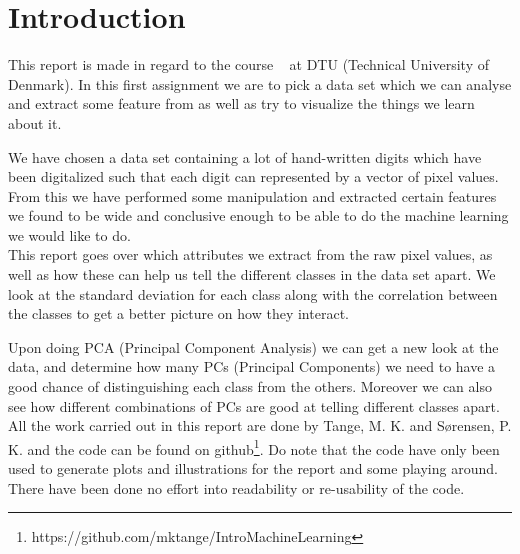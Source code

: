 \chapter{Introduction}
This report is made in regard to the course \textsf{\courseno\ \coursename} at DTU (Technical University of Denmark). In this first assignment we are to pick a data set which we can analyse and extract some feature from as well as try to visualize the things we learn about it.

We have chosen a data set containing a lot of hand-written digits which have been digitalized such that each digit can represented by a vector of pixel values. From this we have performed some manipulation and extracted certain features we found to be wide and conclusive enough to be able to do the machine learning we would like to do. \\

This report goes over which attributes we extract from the raw pixel values, as well as how these can help us tell the different classes in the data set apart. We look at the standard deviation for each class along with the correlation between the classes to get a better picture on how they interact.

Upon doing PCA (Principal Component Analysis) we can get a new look at the data, and determine how many PCs (Principal Components) we need to have a good chance of distinguishing each class from the others. Moreover we can also see how different combinations of PCs are good at telling different classes apart.\\

All the work carried out in this report are done by Tange, M. K. and Sørensen, P. K. and the code can be found on github\footnote{https://github.com/mktange/IntroMachineLearning}. Do note that the code have only been used to generate plots and illustrations for the report and some playing around. There have been done no effort into readability or re-usability of the code.